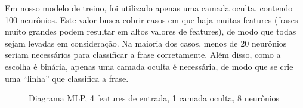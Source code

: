 Em nosso modelo de treino, foi utilizado apenas uma camada oculta, contendo 100 neurônios. Este valor busca cobrir casos em que haja muitas features (frases muito grandes podem resultar em altos valores de features), de modo que todas sejam levadas em consideração. Na maioria dos casos, menos de 20 neurônios seriam necessários para classificar a frase corretamente. Além disso, como a escolha é binária, apenas uma camada oculta é necessária, de modo que se crie uma “linha” que classifica a frase.

\begin{figure}[!htb]
    \caption{\label{fig:my-label} Diagrama MLP,  4 features de entrada, 1 camada oculta, 8 neurônios}
\end{figure}